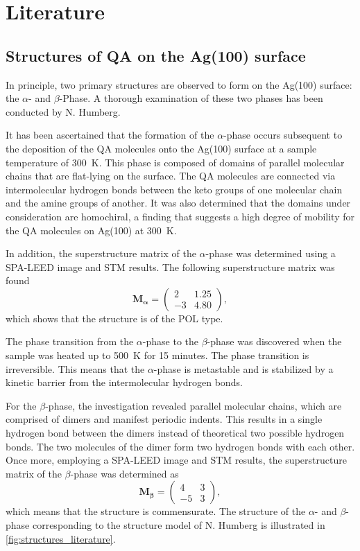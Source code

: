 \chapter{Literature}
\section{Structures of \acs{QA} on the Ag(100) surface}

In principle, two primary structures are observed to form on the Ag(100) surface: the $\alpha$- and $\beta$-Phase. A thorough examination of these two phases has been conducted by N. Humberg.\autocite{Humberg2024}

It has been ascertained that the formation of the $\alpha$-phase occurs subsequent to the deposition of the \ac{QA} molecules onto the Ag(100) surface at a sample temperature of 300~\si{K}. This phase is composed of domains of parallel molecular chains that are flat-lying on the surface. The \ac{QA} molecules are connected via intermolecular hydrogen bonds between the keto groups of one molecular chain and the amine groups of another. It was also determined that the domains under consideration are homochiral, a finding that suggests a high degree of mobility for the \ac{QA} molecules on Ag(100) at 300~\si{K}.

In addition, the superstructure matrix of the $\alpha$-phase was determined using a \ac{SPA-LEED} image and \ac{STM} results. The following superstructure matrix was found
\begin{equation*}
\mathbf{M_\alpha} =\begin{pmatrix}
2 & 1.25 \\
-3 & 4.80 
\end{pmatrix},
\end{equation*}
which shows that the structure is of the \ac{POL} type.


The phase transition from the $\alpha$-phase to the $\beta$-phase was discovered when the sample was heated up to 500~\si{K} for 15 minutes. The phase transition is irreversible. This means that the $\alpha$-phase is metastable and is stabilized by a kinetic barrier from the intermolecular hydrogen bonds.


For the $\beta$-phase, the investigation revealed parallel molecular chains, which are comprised of dimers and manifest periodic indents. This results in a single hydrogen bond between the dimers instead of theoretical two possible hydrogen bonds. The two molecules of the dimer form two hydrogen bonds with each other. Once more, employing a \ac{SPA-LEED} image and \ac{STM} results, the superstructure matrix of the $\beta$-phase was determined as
\begin{equation*}
\mathbf{M_\beta} =\begin{pmatrix}
4 & 3 \\
-5 & 3 
\end{pmatrix},
\end{equation*}
which means that the structure is commensurate.
The structure of the $\alpha$- and $\beta$-phase corresponding to the structure model of N. Humberg is illustrated in \autoref{fig:structures_literature}.

